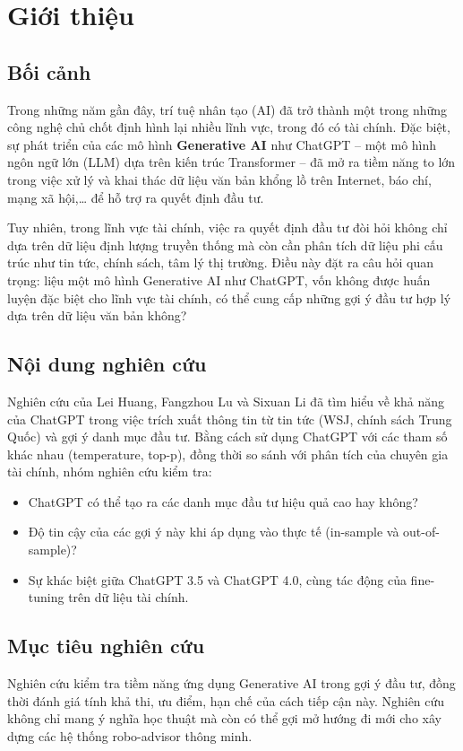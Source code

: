 \documentclass[a4paper,12pt]{article}
\begin{document}
\newpage

\section{Giới thiệu}

\subsection{Bối cảnh}
Trong những năm gần đây, trí tuệ nhân tạo (AI) đã trở thành một trong những công nghệ chủ chốt định hình lại nhiều lĩnh vực, trong đó có tài chính. Đặc biệt, sự phát triển của các mô hình \textbf{Generative AI} như ChatGPT – một mô hình ngôn ngữ lớn (LLM) dựa trên kiến trúc Transformer – đã mở ra tiềm năng to lớn trong việc xử lý và khai thác dữ liệu văn bản khổng lồ trên Internet, báo chí, mạng xã hội,… để hỗ trợ ra quyết định đầu tư.

Tuy nhiên, trong lĩnh vực tài chính, việc ra quyết định đầu tư đòi hỏi không chỉ dựa trên dữ liệu định lượng truyền thống mà còn cần phân tích dữ liệu phi cấu trúc như tin tức, chính sách, tâm lý thị trường. Điều này đặt ra câu hỏi quan trọng: liệu một mô hình Generative AI như ChatGPT, vốn không được huấn luyện đặc biệt cho lĩnh vực tài chính, có thể cung cấp những gợi ý đầu tư hợp lý dựa trên dữ liệu văn bản không?

\subsection{Nội dung nghiên cứu}
Nghiên cứu của Lei Huang, Fangzhou Lu và Sixuan Li đã tìm hiểu về khả năng của ChatGPT trong việc trích xuất thông tin từ tin tức (WSJ, chính sách Trung Quốc) và gợi ý danh mục đầu tư. Bằng cách sử dụng ChatGPT với các tham số khác nhau (temperature, top-p), đồng thời so sánh với phân tích của chuyên gia tài chính, nhóm nghiên cứu kiểm tra:
\begin{itemize}
    \item ChatGPT có thể tạo ra các danh mục đầu tư hiệu quả cao hay không?
    \item Độ tin cậy của các gợi ý này khi áp dụng vào thực tế (in-sample và out-of-sample)?
    \item Sự khác biệt giữa ChatGPT 3.5 và ChatGPT 4.0, cùng tác động của fine-tuning trên dữ liệu tài chính.
\end{itemize}

\subsection{Mục tiêu nghiên cứu}
Nghiên cứu kiểm tra tiềm năng ứng dụng Generative AI trong gợi ý đầu tư, đồng thời đánh giá tính khả thi, ưu điểm, hạn chế của cách tiếp cận này. Nghiên cứu không chỉ mang ý nghĩa học thuật mà còn có thể gợi mở hướng đi mới cho xây dựng các hệ thống robo-advisor thông minh.
\end{document}
